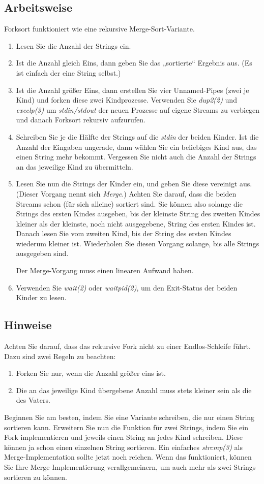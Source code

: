 \subsection{Arbeitsweise}
Forksort funktioniert wie eine rekursive Merge-Sort-Variante.
\begin{enumerate}
\item Lesen Sie die Anzahl der Strings ein.
\item Ist die Anzahl gleich Eins, dann geben Sie das „sortierte“
  Ergebnis aus. (Es ist einfach der eine String selbst.)
\item Ist die Anzahl größer Eins, dann erstellen Sie vier Unnamed-Pipes (zwei
  je Kind) und forken diese zwei Kindprozesse. Verwenden Sie \emph{dup2(2)} und
  \emph{execlp(3)} um \emph{stdin/stdout} der neuen Prozesse auf eigene Streams
  zu verbiegen und danach Forksort rekursiv aufzurufen.
\item Schreiben Sie je die Hälfte der Strings auf die \emph{stdin} der
  beiden Kinder. Ist die Anzahl der Eingaben ungerade, dann wählen Sie
  ein beliebiges Kind aus, das einen String mehr bekommt. Vergessen Sie nicht
  auch die Anzahl der Strings an das jeweilige Kind zu übermitteln.
\item Lesen Sie nun die Strings der Kinder ein, und geben Sie diese vereinigt
  aus. (Dieser Vorgang nennt sich \emph{Merge}.) Achten Sie darauf, dass die
  beiden Streams schon (für sich alleine) sortiert sind. Sie können also
  solange die Strings des ersten Kindes ausgeben, bis der kleinste String des
  zweiten Kindes kleiner als der kleinste, noch nicht ausgegebene, String des
  ersten Kindes ist. Danach lesen Sie vom zweiten Kind, bis der String des
  ersten Kindes wiederum kleiner ist. Wiederholen Sie diesen Vorgang solange,
  bis alle Strings ausgegeben sind.

  Der Merge-Vorgang muss einen linearen Aufwand haben.
\item Verwenden Sie \emph{wait(2)} oder \emph{waitpid(2)}, um den Exit-Status
  der beiden Kinder zu lesen.
\end{enumerate}

\subsection{Hinweise}
Achten Sie darauf, dass das rekursive Fork nicht zu einer Endlos-Schleife führt.
Dazu sind zwei Regeln zu beachten:
\begin{enumerate}
\item Forken Sie nur, wenn die Anzahl größer eins ist.
\item Die an das jeweilige Kind übergebene Anzahl muss stets kleiner sein als
  die des Vaters.
\end{enumerate}
Beginnen Sie am besten, indem Sie eine Variante schreiben, die nur einen String
sortieren kann. Erweitern Sie nun die Funktion für zwei Strings, indem Sie ein
Fork implementieren und jeweils einen String an jedes Kind schreiben. Diese
können ja schon einen einzelnen String sortieren. Ein einfaches
\emph{strcmp(3)} als Merge-Implementation sollte jetzt noch reichen. Wenn das
funktioniert, können Sie Ihre Merge-Implementierung verallgemeinern, um auch
mehr als zwei Strings sortieren zu können.

